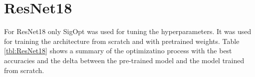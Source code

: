 \begin{table}[h] \centering
{}
\caption{Hyper parameters for ResNet18 optimized with SigOpt. First row shows hyperparameters training the architecture from scratch. Second row used pre-trained weights from ImageNet}
\label{tbl:VGG}
\end{table}














\section{ResNet18}

For ResNet18 only SigOpt was used for tuning the hyperparameters. It was used for training the architecture from scratch and with pretrained weights. Table \ref{tbl:ResNet18} shows a summary of the optimizatino process with the best accuracies and the delta between the pre-trained model and the model trained from scratch.

\begin{table}[h] \centering
{}
\caption{Hyper parameters for ResNet18 optimized with SigOpt. First row shows hyperparameters training the architecture from scratch. Second row used pre-trained weights from ImageNet}
\label{tbl:ResNet18}
\end{table}

